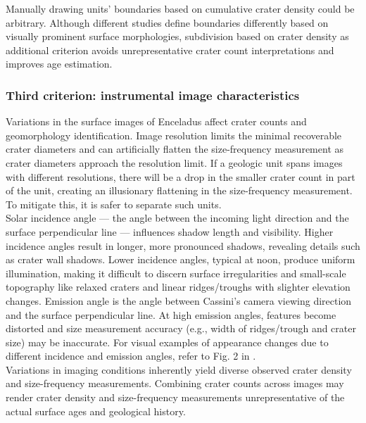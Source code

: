 \documentclass[preprint,12pt,3p,times,authoryear]{elsarticle}
\begin{document}
Manually drawing units’ boundaries based on cumulative crater density could be arbitrary. Although different studies define boundaries differently based on visually prominent surface morphologies, subdivision based on crater density as additional criterion avoids unrepresentative crater count interpretations and improves age estimation.

\subsubsection{Third criterion: instrumental image characteristics}
Variations in the surface images of Enceladus affect crater counts and geomorphology identification. Image resolution limits the minimal recoverable crater diameters and can artificially flatten the size-frequency measurement as crater diameters approach the resolution limit. If a geologic unit spans images with different resolutions, there will be a drop in the smaller crater count in part of the unit, creating an illusionary flattening in the size-frequency measurement. To mitigate this, it is safer to separate such units.\\

Solar incidence angle — the angle between the incoming light direction and the surface perpendicular line — influences shadow length and visibility. Higher incidence angles result in longer, more pronounced shadows, revealing details such as crater wall shadows.
Lower incidence angles, typical at noon, produce uniform illumination, making it difficult to discern surface irregularities and small-scale topography like relaxed craters and linear ridges/troughs with slighter elevation changes. Emission angle is the angle between Cassini's camera viewing direction and the surface perpendicular line. At high emission angles, features become distorted and size measurement accuracy (e.g., width of ridges/trough and crater size) may be inaccurate. For visual examples of appearance changes due to different incidence and emission angles, refer to Fig. 2 in \citet{Bland2018}.\\

Variations in imaging conditions inherently yield diverse observed crater density and size-frequency measurements. Combining crater counts across images may render crater density and size-frequency measurements unrepresentative of the actual surface ages and geological history.\\
\end{document}
